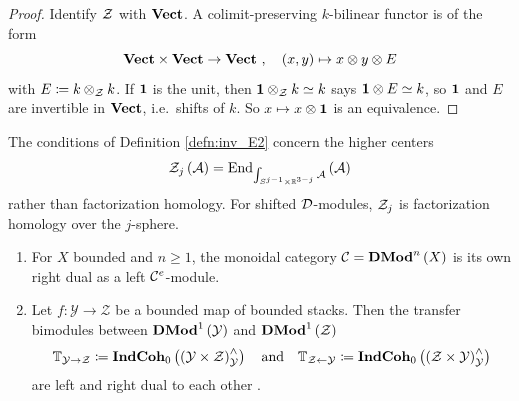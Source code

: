 \begin{proof}
Identify $\mathcal{Z}$ with $\mathbf{Vect}$. A colimit-preserving $k$-bilinear functor is of the form
\begin{equation*}
\mathbf{Vect}\times\mathbf{Vect}\to\mathbf{Vect}\ ,\quad \left(x,y\right)\mapsto x\otimes y\otimes E
\end{equation*}
with
$E\coloneqq k\otimes_{\mathcal{Z}} k$. If $\mathbf{1}$ is the unit, then $\mathbf{1}\otimes_{\mathcal{Z}} k\simeq k$ says
$\mathbf{1}\otimes E\simeq k$, so $\mathbf{1}$ and $E$ are invertible in $\mathbf{Vect}$, i.e.\ shifts of $k$.
So $x\mapsto x\otimes\mathbf{1}$ is an equivalence.
\end{proof}

The conditions of Definition \ref{defn:inv_E2} concern the higher centers
\begin{equation*}
\mathcal{Z}_j\left(\mathcal{A}\right)=\operatorname{End}_{\int_{S^{j-1}\times\mathbb{R}^{3-j}}\mathcal{A}}\left(\mathcal{A}\right)
\end{equation*}
rather than
factorization homology. For shifted $\mathcal{D}$-modules, $\mathcal{Z}_j$ is factorization homology over the
$j$-sphere.

\begin{lem}
\label{lem:H_duals}
\leavevmode
\begin{enumerate}
\item For $X$ bounded and $n\geq1$, the monoidal category $\mathcal{C}=\mathbf{DMod}^n\left(X\right)$ is its own
right dual as a left $\mathcal{C}^e$-module.
\item Let $f\colon\mathcal{Y}\to\mathcal{Z}$ be a bounded map of bounded stacks. Then the
transfer bimodules between $\mathbf{DMod}^1\left(\mathcal{Y}\right)$ and $\mathbf{DMod}^1\left(\mathcal{Z}\right)$
\begin{equation*}
\mathbb{T}_{\mathcal{Y}\to\mathcal{Z}}\coloneqq
\mathbf{IndCoh}_0\left(\left(\mathcal{Y}\times\mathcal{Z}\right)^\wedge_{\mathcal{Y}}\right)
\quad\text{and}\quad
\mathbb{T}_{\mathcal{Z}\leftarrow\mathcal{Y}}\coloneqq
\mathbf{IndCoh}_0\left(\left(\mathcal{Z}\times\mathcal{Y}\right)^\wedge_{\mathcal{Y}}\right)
\end{equation*}
are left and right dual to each other \cite{Ber:ShvCatH}.
\end{enumerate}
\end{lem}

